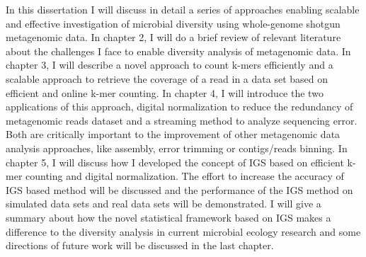 In this dissertation I will discuss in detail a series of approaches enabling
scalable and effective investigation of microbial diversity using whole-genome
shotgun metagenomic data. In chapter 2, I will do a brief review of relevant
literature about the challenges I face to enable diversity analysis of
metagenomic data. In chapter 3, I will describe a novel approach to count
k-mers efficiently and a scalable approach to retrieve the coverage of a read
in a data set based on efficient and online k-mer counting. In chapter 4, I
will  introduce the two applications of this approach, digital normalization to
reduce the redundancy of metagenomic reads dataset and a streaming method to
analyze sequencing error. Both are critically important to the improvement of
other metagenomic data analysis approaches, like assembly, error trimming or
contigs/reads binning. In chapter 5, I will discuss how I developed the concept
of IGS based on efficient k-mer counting and digital normalization. The effort
to increase the accuracy of IGS based method will be discussed and the
performance of the IGS method on simulated data sets and real data sets will be
demonstrated. I will give a summary about how the novel statistical framework
based on IGS makes a difference to the diversity analysis in current microbial
ecology research and some directions of future work will be discussed in the
last chapter.


